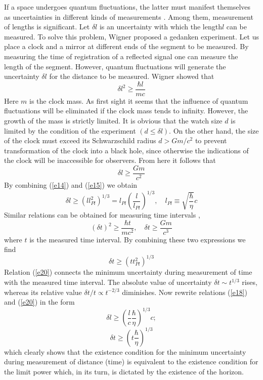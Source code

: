 \documentclass [12pt]{article}
\begin{document}
If a space undergoes quantum fluctuations, the latter must manifest themselves as uncertainties in different kinds of measurements \cite{s14,s15,s16}. Among them, measurement of lengths is   significant.  Let  $\delta l$ is  an uncertainty with which the length$l$  can be measured. To solve this problem, Wigner \cite{s17,s18} proposed a gedanken experiment. Let us place a clock   and a mirror at different ends of the segment to be measured. By measuring the time of registration of a  reflected signal one can measure the length of the segment. However, quantum fluctuations will generate the uncertainty $\delta l$ for the distance to be measured. Wigner showed that
\begin{equation}\label{e16}
  \delta {l^2} \ge \frac{{\hbar l}}{{mc}}
\end{equation}
Here  $m$ is the clock mass. As first sight it seems that the influence of quantum fluctuations will  be eliminated if the clock mass tends to infinity. However, the growth of the mass is strictly limited.  It is obvious that  the watch size  $d$ is limited   by the condition of the experiment $\left( {d \le \delta l} \right)$. On the other hand, the size of the clock must exceed its  Schwarzschild radius $d > Gm/{c^2}$ to prevent transformation of the clock into a black hole, since otherwise the indications of the clock will be inaccessible  for observers. From here it follows that
\begin{equation}\label{e17}
  \delta l \ge \frac{{Gm}}{{{c^2}}}
\end{equation}
By combining  (\ref{e14})  and (\ref{e15}) we obtain
\begin{equation}\label{e18}
  \delta l \ge {\left( {ll_{Pl}^2} \right)^{1/3}} = {l_{Pl}}{\left( {\frac{l}{{{l_{Pl}}}}} \right)^{1/3}},\quad {l_{Pl}} \equiv \sqrt {\frac{\hbar }{\eta }} c
\end{equation}
Similar relations can be obtained for measuring time intervals \cite{s19,s20},
\begin{equation}\label{e19}
  {\left( {\delta t} \right)^2} \ge \frac{{\hbar t}}{{m{c^2}}},\quad \delta t \ge \frac{{Gm}}{{{c^3}}}
\end{equation}
where  $t$  is the measured time interval. By combining these two expressions we find
\begin{equation}\label{e20}
  \delta t \ge {\left( {tt_{Pl}^2} \right)^{1/3}}
\end{equation}
Relation (\ref{e20}) connects the minimum uncertainty during  measurement of time with the measured time interval. The absolute  value of uncertainty   $\delta t \sim {t^{1/3}}$ rises,  whereas its relative value  $\delta t/t \propto {t^{ - 2/3}}$ diminishes. Now rewrite  relations  (\ref{e18}) and (\ref{e20}) in the form
\[\delta l \ge {\left( {\frac{l}{c}\frac{\hbar }{\eta }} \right)^{1/3}}c;\]
\begin{equation}\label{e21}
  \delta t \ge {\left( {t\frac{\hbar }{\eta }} \right)^{1/3}}
\end{equation}
which clearly shows that the existence condition for the minimum uncertainty during measurement of distance (time) is equivalent to the existence condition for the limit power which, in its turn, is dictated by the existence of the  horizon.
\end{document}
